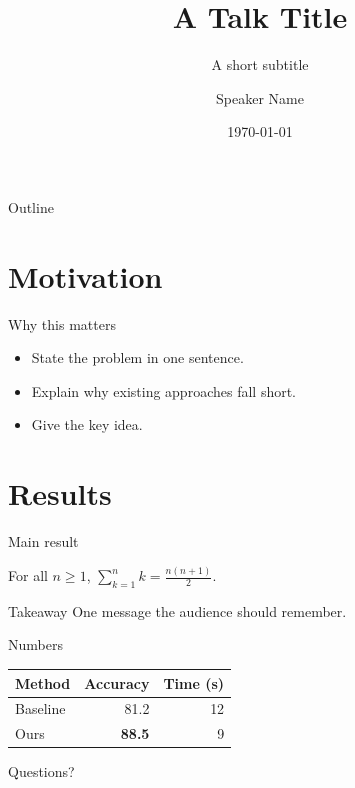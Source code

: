 \documentclass[aspectratio=169]{beamer}
\title{A Talk Title}
\subtitle{A short subtitle}
\author{Speaker Name}
\institute{Institution}
\date{\today}
\begin{document}
\maketitle

\begin{frame}{Outline}
  \tableofcontents
\end{frame}

\section{Motivation}
\begin{frame}{Why this matters}
  \begin{itemize}
    \item State the problem in one sentence.
    \item Explain why existing approaches fall short.
    \item Give the key idea.
  \end{itemize}
\end{frame}

\section{Results}
\begin{frame}{Main result}
  \begin{theorem}
    For all $n \ge 1$, $\sum_{k=1}^{n} k = \frac{n(n+1)}{2}$.
  \end{theorem}
  \begin{alertblock}{Takeaway}
    One message the audience should remember.
  \end{alertblock}
\end{frame}

\begin{frame}{Numbers}
  \centering
  \begin{tabular}{lrr}
    \toprule
    Method & Accuracy & Time (s) \\
    \midrule
    Baseline & 81.2 & 12 \\
    Ours & \textbf{88.5} & 9 \\
    \bottomrule
  \end{tabular}
\end{frame}

\begin{frame}[standout]
  Questions?
\end{frame}
\end{document}

